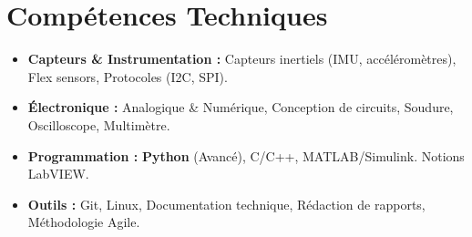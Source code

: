 \documentclass[a4paper,11pt]{article}
\begin{document}
\section{Compétences Techniques}
\begin{itemize}[leftmargin=*, nosep]
    \item \small{\textbf{Capteurs \& Instrumentation :} Capteurs inertiels (IMU, accéléromètres), Flex sensors, Protocoles (I2C, SPI).}
    \item \small{\textbf{Électronique :} Analogique \& Numérique, Conception de circuits, Soudure, Oscilloscope, Multimètre.}
    \item \small{\textbf{Programmation :} \textbf{Python} (Avancé), C/C++, MATLAB/Simulink. Notions LabVIEW.}
    \item \small{\textbf{Outils :} Git, Linux, Documentation technique, Rédaction de rapports, Méthodologie Agile.}
\end{itemize}

\end{document}
